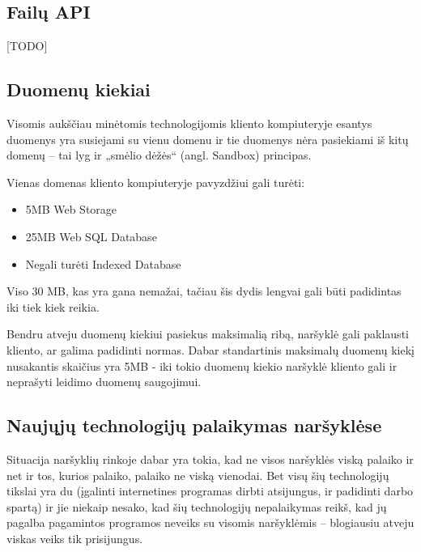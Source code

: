 \documentclass[12pt,a4paper,titlepage]{article}
\begin{document}
\subsection{Failų API}
[TODO]

\subsection{Duomenų kiekiai}

Visomis aukščiau minėtomis technologijomis kliento kompiuteryje esantys duomenys yra susiejami su vienu domenu ir tie duomenys nėra pasiekiami iš kitų domenų – tai lyg ir „smėlio dėžės“ (angl. Sandbox) principas.

Vienas domenas kliento kompiuteryje pavyzdžiui gali turėti:
\begin{itemize}
  \item 5MB Web Storage
  \item 25MB Web SQL Database
  \item Negali turėti Indexed Database
\end{itemize}
Viso 30 MB, kas yra gana nemažai, tačiau šis dydis lengvai gali būti padidintas iki tiek kiek reikia.

Bendru atveju duomenų kiekiui pasiekus maksimalią ribą, naršyklė gali paklausti kliento, ar galima padidinti normas. Dabar standartinis maksimalų duomenų kiekį nusakantis skaičius yra 5MB - iki tokio duomenų kiekio naršyklė kliento gali ir neprašyti leidimo duomenų saugojimui.

\subsection{Naujųjų technologijų palaikymas naršyklėse}

Situacija naršyklių rinkoje dabar yra tokia, kad ne visos naršyklės viską palaiko ir net ir tos, kurios palaiko, palaiko ne viską vienodai. Bet visų šių technologijų tikslai yra du (įgalinti internetines programas dirbti atsijungus, ir padidinti darbo spartą) ir jie niekaip nesako, kad šių technologijų nepalaikymas reikš, kad jų pagalba pagamintos programos neveiks su visomis naršyklėmis – blogiausiu atveju viskas veiks tik prisijungus.
\end{document}
